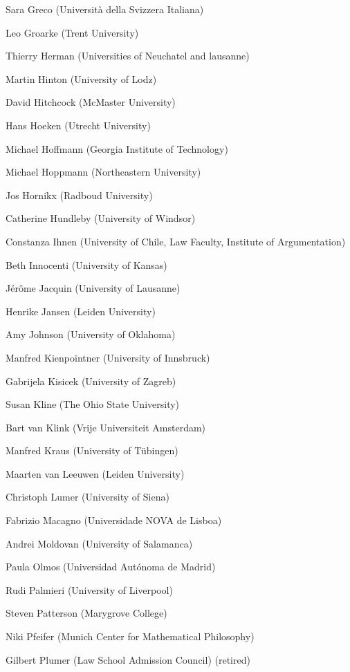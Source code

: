 \begin{compactitem}[]
		\item[] Sara Greco (Università della Svizzera Italiana)
		\item[] Leo Groarke (Trent University)
		\item[] Thierry Herman (Universities of Neuchatel and lausanne)
		\item[] Martin Hinton (University of Lodz)
		\item[] David Hitchcock (McMaster University)
		\item[] Hans Hoeken (Utrecht University)
		\item[] Michael Hoffmann (Georgia Institute of Technology)
		\item[] Michael Hoppmann (Northeastern University)
		\item[] Jos Hornikx (Radboud University)
		\item[] Catherine Hundleby (University of Windsor)
		\item[] Constanza Ihnen (University of Chile, Law Faculty, Institute of Argumentation)
		\item[] Beth Innocenti (University of Kansas)
		\item[] Jérôme Jacquin (University of Lausanne)
		\item[] Henrike Jansen (Leiden University)
		\item[] Amy Johnson (University of Oklahoma)
		\item[] Manfred Kienpointner (University of Innsbruck)
		\item[] Gabrijela Kisicek (University of Zagreb)
		\item[] Susan Kline (The Ohio State University)
		\item[] Bart van Klink (Vrije Universiteit Amsterdam)
		\item[] Manfred Kraus (University of Tübingen)
		\item[] Maarten van Leeuwen (Leiden University)
		\item[] Christoph Lumer (University of Siena)
		\item[] Fabrizio Macagno (Universidade NOVA de Lisboa)
		\item[] Andrei Moldovan (University of Salamanca)
		\item[] Paula Olmos (Universidad Autónoma de Madrid)
		\item[] Rudi Palmieri (University of Liverpool)
		\item[] Steven Patterson (Marygrove College)
		\item[] Niki Pfeifer (Munich Center for Mathematical Philosophy)
		\item[] Gilbert Plumer (Law School Admission Council) (retired)

\end{compactitem}
